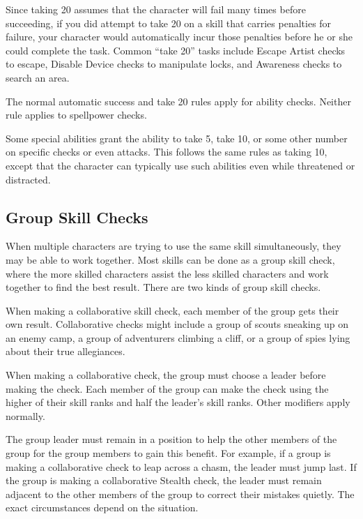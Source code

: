 Since taking 20 assumes that the character will fail many times before succeeding, if you did attempt to take 20 on a skill that carries penalties for failure, your character would automatically incur those penalties before he or she could complete the task. Common ``take 20'' tasks include Escape Artist checks to escape, Disable Device checks to manipulate locks, and Awareness checks to search an area.

 The normal automatic success and take 20 rules apply for ability checks. Neither rule applies to spellpower checks.

 Some special abilities grant the ability to take 5, take 10, or some other number on specific checks or even attacks. This follows the same rules as taking 10, except that the character can typically use such abilities even while threatened or distracted.

\subsection{Group Skill Checks}
When multiple characters are trying to use the same skill simultaneously, they may be able to work together. Most skills can be done as a group skill check, where the more skilled characters assist the less skilled characters and work together to find the best result. There are two kinds of group skill checks.

 When making a collaborative skill check, each member of the group gets their own result. Collaborative checks might include a group of scouts sneaking up on an enemy camp, a group of adventurers climbing a cliff, or a group of spies lying about their true allegiances.

When making a collaborative check, the group must choose a leader before making the check. Each member of the group can make the check using the higher of their skill ranks and half the leader's skill ranks. Other modifiers apply normally.

The group leader must remain in a position to help the other members of the group for the group members to gain this benefit. For example, if a group is making a collaborative check to leap across a chasm, the leader must jump last. If the group is making a collaborative Stealth check, the leader must remain adjacent to the other members of the group to correct their mistakes quietly. The exact circumstances depend on the situation. 

